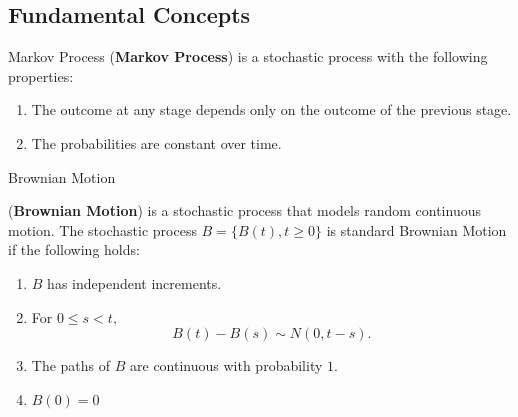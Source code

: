 \subsection{Fundamental Concepts}
%
\begin{frame}{Markov Process}
(\textbf{Markov Process}) is a stochastic process with the following properties: 
\begin{enumerate}
\item The outcome at any stage depends only on the outcome of the previous stage.
\item The probabilities are constant over time.   
\end{enumerate}
\end{frame}


\begin{frame}{Brownian Motion}
\begin{definition}(\textbf{Brownian Motion}) is a stochastic process that models random continuous motion. The stochastic process $B=\{B(t), t\geq 0\}$ is standard Brownian Motion if the following holds:
\begin{enumerate}
\item $B$ has independent increments.
\item For $0 \leq s < t,$ $$B(t)-B(s) \sim N(0,t-s).$$
\item The paths of $B$ are continuous with probability $1$.
\item $B(0)=0$ 
\end{enumerate}
\end{definition}
\end{frame}

\begin{frame}
\vfill

\begin{center}
\end{center}

\vfill
  \cite{doi:10.1137/S0036144500378302}
\end{frame}

